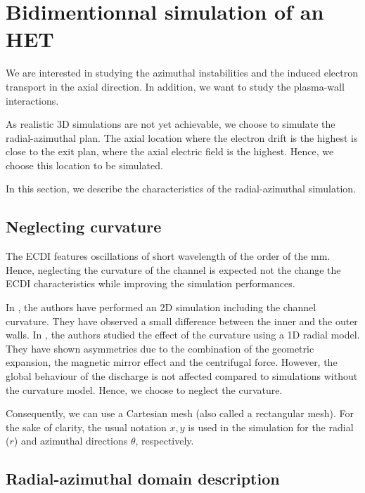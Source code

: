 
\section{Bidimentionnal simulation of an \ac{HET}}

We are interested in studying the azimuthal instabilities and the induced electron transport in the axial direction.
In addition, we want to study the plasma-wall interactions.

As realistic \ac{3D} simulations are not yet achievable, we choose to simulate the radial-azimuthal plan.
The axial location where the electron drift is the highest is close to the exit plan, where the axial electric field is the highest.
Hence, we choose this location to be simulated.

In this section, we describe the characteristics of the radial-azimuthal simulation.


\subsection{Neglecting curvature}
The \ac{ECDI} features oscillations of short wavelength of the order of the mm.
Hence, neglecting the curvature of the channel is expected not the change the \ac{ECDI} characteristics while improving the simulation performances.

In  \citet{heron2013},  the authors have performed an \ac{2D} simulation including the channel curvature.
They have observed a small difference between the inner and the outer walls.
In  \citet{dominguez-vazquez2018}, the authors studied the effect of the curvature using a \ac{1D} radial model.
They have shown asymmetries due to the combination of the geometric expansion, the magnetic mirror effect and the centrifugal force.
However, the global behaviour of the discharge is not affected compared to simulations without the curvature model.
Hence, we choose to neglect the curvature.

Consequently, we can use a Cartesian mesh (also called a rectangular mesh).
For the sake of clarity, the usual notation $x,y$ is used in the simulation for the radial ($r$) and azimuthal directions $\theta$, respectively.

\subsection{Radial-azimuthal domain description}


